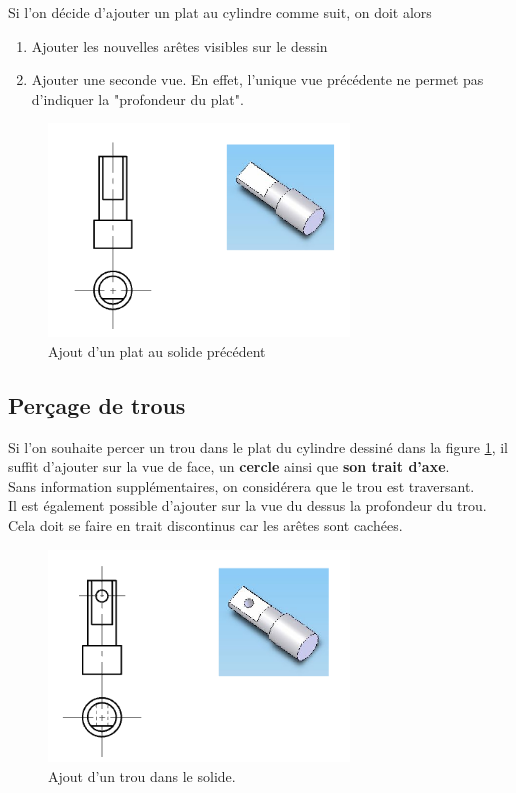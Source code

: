 Si l'on décide d'ajouter un plat au cylindre comme suit, on doit alors 
\begin{enumerate}
    \item Ajouter les nouvelles arêtes visibles sur le dessin
    \item Ajouter une seconde vue. En effet, l'unique vue précédente ne permet pas d'indiquer la "profondeur du plat".
\end{enumerate}

\begin{figure}[H]
    \centering
    \includegraphics[width = 8cm]{Images/ImagesDessinTechnique/platCylindre.png}
    \caption{Ajout d'un plat au solide précédent}
    \label{fig:cylindrePlat}
\end{figure}



\subsection{Perçage de trous}

Si l'on souhaite percer un trou dans le plat du cylindre dessiné dans la figure \ref{fig:cylindrePlat}, il suffit d'ajouter sur la vue de face, un \textbf{cercle} ainsi que \textbf{son trait d'axe}.\\
Sans information supplémentaires, on considérera que le trou est traversant.\\

Il est également possible d'ajouter sur la vue du dessus la profondeur du trou. Cela doit se faire en trait discontinus car les arêtes sont cachées.

\begin{figure}[H]
    \centering
    \includegraphics[width = 8cm]{Images/ImagesDessinTechnique/trouCylindre.png}
    \caption{Ajout d'un trou dans le solide.}
    \label{fig:my_label}
\end{figure}


